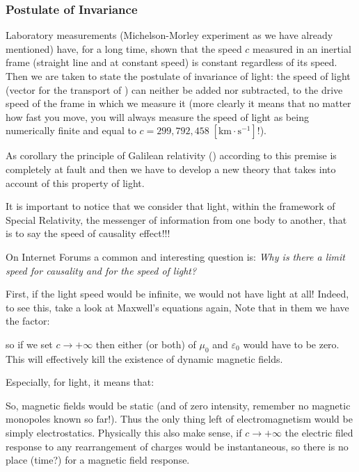 	\subsubsection{Postulate of Invariance}\label{postulate of invariance}
	Laboratory measurements (Michelson-Morley experiment as we have already mentioned) have, for a long time, shown that the speed $c$ measured in an inertial frame (straight line and at constant speed) is constant regardless of its speed. Then we are taken to state the postulate of invariance of light: the speed of light (vector for the transport of ) can neither be added nor subtracted, to the drive speed of the frame in which we measure it (more clearly it means that no matter how fast you move, you will always measure the speed of light as being numerically finite and equal to $c=299,792,458\; [\text{km}\cdot  \text{s}^{-1}]$!).
	
	As corollary the principle of Galilean relativity () according to this premise is completely at fault and then we have to develop a new theory that takes into account of this property of light.
	
	\begin{tcolorbox}[title=Remark,colframe=black,arc=10pt]
	It is important to notice that we consider that light, within the framework of Special Relativity, the messenger of information from one body to another, that is to say the speed of causality effect!!!
	\end{tcolorbox}
	On Internet Forums a common and interesting question is: \textit{Why is there a limit speed for causality and for the speed of light?}
	
	First, if the light speed would be infinite, we would not have light at all! Indeed, to see this, take a look at Maxwell's equations again, Note that in them we have the factor:
	
	so if we set $c\rightarrow +\infty$ then either (or both) of $\mu_0$ and $\varepsilon_0$ would have to be zero. This will effectively kill the existence of dynamic magnetic fields.

	Especially, for light, it means that:
	
	So, magnetic fields would be static (and of zero intensity, remember no magnetic monopoles known so far!). Thus the only thing left of electromagnetism would be simply electrostatics. Physically this also make sense, if $c\rightarrow +\infty$ the electric filed response to any rearrangement of charges would be instantaneous, so there is no place (time?) for a magnetic field response.
	
